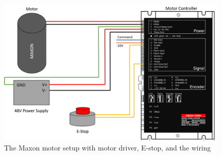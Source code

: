 \documentclass[12pt]{report}
\begin{document}
		
	\begin{figure}[h] 
		\centering
		\includegraphics[width=0.9\linewidth]{Motor_setup}
		\caption{The Maxon motor setup with motor driver, E-stop, and the wiring}
		\label{fig:actuator}
	\end{figure}
		
	
	
\end{document}
